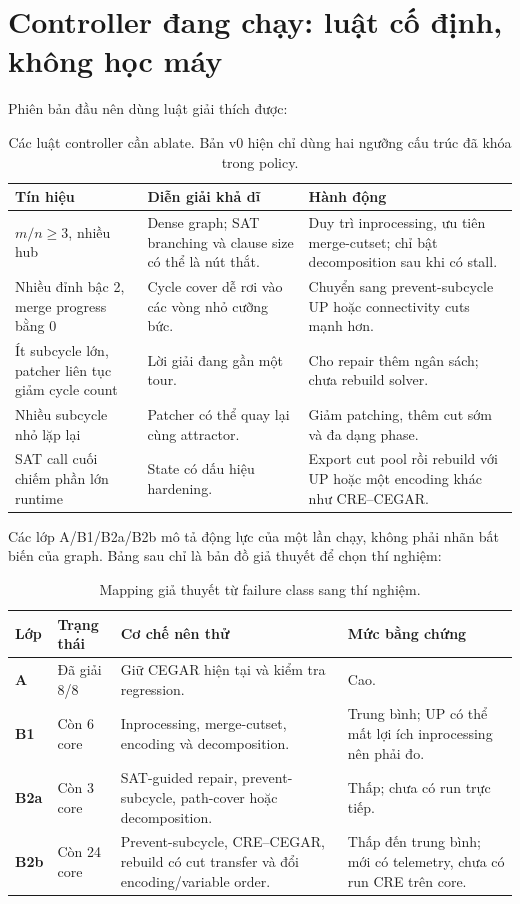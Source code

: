 \documentclass[11pt,a4paper,oneside]{scrreprt}
\begin{document}
\section{Controller đang chạy: luật cố định, không học máy}

Phiên bản đầu nên dùng luật giải thích được:

\begin{table}[H]
\centering
\small
\begin{tabularx}{\textwidth}{p{35mm} X X}
\toprule
Tín hiệu & Diễn giải khả dĩ & Hành động \\
\midrule
$m/n\geq 3$, nhiều hub & Dense graph; SAT branching và clause size có thể là nút thắt. & Duy trì inprocessing, ưu tiên merge-cutset; chỉ bật decomposition sau khi có stall. \\
Nhiều đỉnh bậc 2, merge progress bằng 0 & Cycle cover dễ rơi vào các vòng nhỏ cưỡng bức. & Chuyển sang prevent-subcycle UP hoặc connectivity cuts mạnh hơn. \\
Ít subcycle lớn, patcher liên tục giảm cycle count & Lời giải đang gần một tour. & Cho repair thêm ngân sách; chưa rebuild solver. \\
Nhiều subcycle nhỏ lặp lại & Patcher có thể quay lại cùng attractor. & Giảm patching, thêm cut sớm và đa dạng phase. \\
SAT call cuối chiếm phần lớn runtime & State có dấu hiệu hardening. & Export cut pool rồi rebuild với UP hoặc một encoding khác như CRE--CEGAR. \\
\bottomrule
\end{tabularx}
\caption{Các luật controller cần ablate. Bản v0 hiện chỉ dùng hai ngưỡng cấu trúc đã khóa trong policy.}
\end{table}

Các lớp A/B1/B2a/B2b mô tả động lực của một lần chạy, không phải nhãn bất biến của graph. Bảng sau chỉ là bản đồ giả thuyết để chọn thí nghiệm:

\begin{table}[H]
\centering
\small
\begin{tabularx}{\textwidth}{>{\bfseries\sffamily}p{15mm} p{31mm} X X}
\toprule
Lớp & Trạng thái & Cơ chế nên thử & Mức bằng chứng \\
\midrule
A & Đã giải 8/8 & Giữ CEGAR hiện tại và kiểm tra regression. & Cao. \\
B1 & Còn 6 core & Inprocessing, merge-cutset, encoding và decomposition. & Trung bình; UP có thể mất lợi ích inprocessing nên phải đo. \\
B2a & Còn 3 core & SAT-guided repair, prevent-subcycle, path-cover hoặc decomposition. & Thấp; chưa có run trực tiếp. \\
B2b & Còn 24 core & Prevent-subcycle, CRE--CEGAR, rebuild có cut transfer và đổi encoding/variable order. & Thấp đến trung bình; mới có telemetry, chưa có run CRE trên core. \\
\bottomrule
\end{tabularx}
\caption{Mapping giả thuyết từ failure class sang thí nghiệm.}
\end{table}
\end{document}
